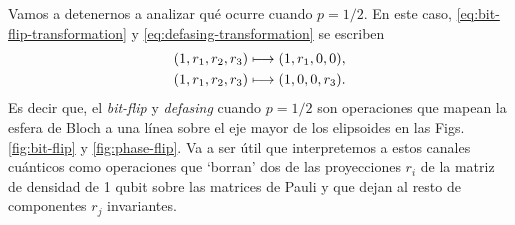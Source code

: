 Vamos a detenernos a analizar qué ocurre cuando $p=1/2$. 
En este caso, \eqref{eq:bit-flip-transformation} y
\eqref{eq:defasing-transformation} se escriben
\begin{align}\label{eq:bit-flip_p=0.5}
\qty(1,r_1,r_2,r_3)&\longmapsto \qty(1,r_1,0,0),\\
\qty(1,r_1,r_2,r_3)&\longmapsto \qty(1,0,0,r_3).\label{eq:defasing_p=0.5}
\end{align}
Es decir que, el \textit{bit-flip} y \textit{defasing} cuando $p=1/2$
son operaciones que mapean la esfera de Bloch a una línea sobre 
el eje mayor de los elipsoides en las Figs. \ref{fig:bit-flip} y \ref{fig:phase-flip}.
Va a ser útil que interpretemos a estos canales cuánticos 
como operaciones que `borran' dos de las proyecciones
$r_i$  de la matriz de densidad de 1 qubit sobre
las matrices de Pauli y que dejan al resto de componentes $r_j$ invariantes.


